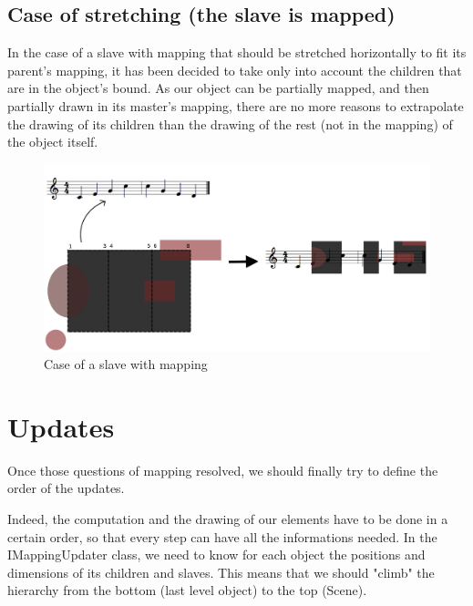 \documentclass[a4paper]{article}
\begin{document}
\subsection{Case of stretching (the slave is mapped)}\label{subsec:complexMap}

In the case of a slave with mapping that should be stretched horizontally to fit its parent's mapping, it has been decided to take only into account the children that are in the object's bound.
As our object can be partially mapped, and then partially drawn in its master's mapping, there are no more reasons to extrapolate the drawing of its children than the drawing of the rest (not in the mapping) of the object itself.

\begin{figure}[h]
\begin{center}
\includegraphics[width=15cm]{img/withStretchTotal.png}
\caption{Case of a slave with mapping}
\label{fig:mapping2}
\end{center}
\end{figure}

\section{Updates}\label{sec:updates}

Once those questions of mapping resolved, we should finally try to define the order of the updates.

Indeed, the computation and the drawing of our elements have to be done in a certain order, so that every step can have all the informations needed. In the IMappingUpdater class, we need to know for each object the positions and dimensions of its children and slaves. This means that we should "climb" the hierarchy from the bottom (last level object) to the top (Scene).
\end{document}
